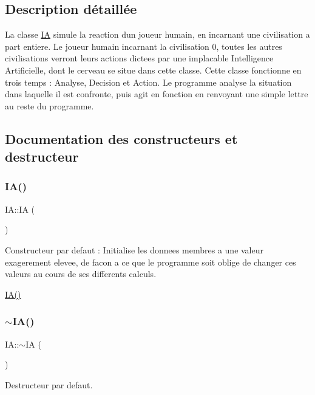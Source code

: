 \subsection{Description détaillée}
La classe \hyperlink{classIA}{IA} simule la reaction d\textquotesingle{}un joueur humain, en incarnant une civilisation a part entiere. Le joueur humain incarnant la civilisation 0, toutes les autres civilisations verront leurs actions dictees par une implacable Intelligence Artificielle, dont le cerveau se situe dans cette classe. Cette classe fonctionne en trois temps \+: Analyse, Decision et Action. Le programme analyse la situation dans laquelle il est confronte, puis agit en fonction en renvoyant une simple lettre au reste du programme. 

\subsection{Documentation des constructeurs et destructeur}
\mbox{\label{classIA_a1105717ffef00df8cb87b2c3a5cb2332}} 
\subsubsection{\texorpdfstring{I\+A()}{IA()}}
{\footnotesize\ttfamily I\+A\+::\+IA (\begin{DoxyParamCaption}{ }\end{DoxyParamCaption})}



Constructeur par defaut \+: Initialise les donnees membres a une valeur exagerement elevee, de facon a ce que le programme soit oblige de changer ces valeurs au cours de ses differents calculs. 

\hyperlink{classIA_a1105717ffef00df8cb87b2c3a5cb2332}{I\+A()} \mbox{\label{classIA_a67d4dd285ae5169239348432bab9ad0e}} 
\subsubsection{\texorpdfstring{$\sim$\+I\+A()}{~IA()}}
{\footnotesize\ttfamily I\+A\+::$\sim$\+IA (\begin{DoxyParamCaption}{ }\end{DoxyParamCaption})}



Destructeur par defaut. 

